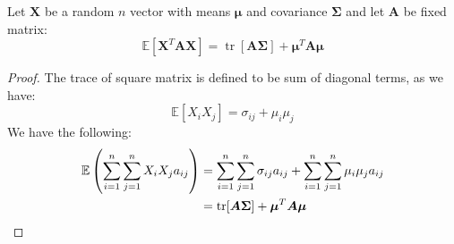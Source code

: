 \begin{proposition}
    Let $\boldsymbol X$ be a random $n$ vector with means $\boldsymbol \mu$ and covariance $\boldsymbol \Sigma$ and let $\boldsymbol A$ be fixed matrix:
    \begin{equation*}
        \mathbb{E}[\boldsymbol X^T\boldsymbol A\boldsymbol X] = \operatorname{tr}[\boldsymbol A\boldsymbol \Sigma] + \boldsymbol \mu^T\boldsymbol A\boldsymbol \mu
    \end{equation*}
\end{proposition}
\begin{proof}
    The trace of square matrix is defined to be sum of diagonal terms, as we have:
    \begin{equation*}
        \mathbb{E}[X_iX_j] = \sigma_{ij} + \mu_i\mu_j
    \end{equation*}
    We have the following:
    \begin{equation*}
    \begin{aligned}
        \mathbb{E}\left( \sum^n_{i=1}\sum^n_{j=1}X_iX_ja_{ij} \right) &= \sum^n_{i=1}\sum^n_{j=1}\sigma_{ij}a_{ij} + \sum^n_{i=1}\sum^n_{j=1}\mu_i\mu_ja_{ij} \\
        &= \operatorname{tr}[\boldsymbol A\boldsymbol \Sigma] + \boldsymbol \mu^T\boldsymbol A\boldsymbol \mu
    \end{aligned}
    \end{equation*}
\end{proof}

